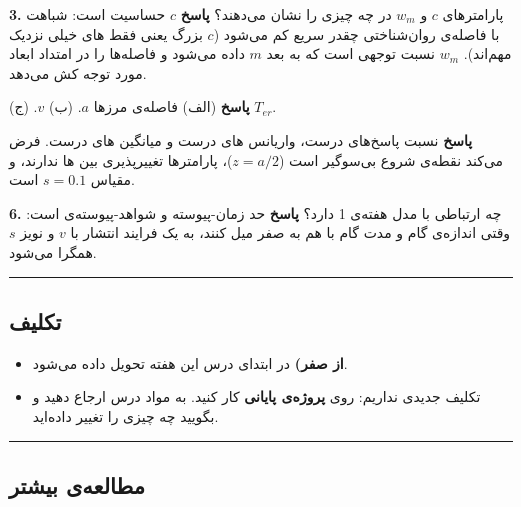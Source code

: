 \textbf{3.} پارامترهای \(c\) و \(w_m\) در  چه چیزی را نشان
می‌دهند؟ \textbf{پاسخ} \(c\) حساسیت است: شباهت با فاصله‌ی روان‌شناختی چقدر
سریع کم می‌شود (\(c\) بزرگ یعنی فقط های خیلی نزدیک مهم‌اند).
\(w_m\) نسبت توجهی است که به بعد \(m\) داده می‌شود و فاصله‌ها را در امتداد
ابعاد مورد توجه کش می‌دهد.

\textbf{پاسخ} (الف) فاصله‌ی مرزها \(a\). (ب)  \(v\). (ج)
 \(T_{er}\).

\textbf{پاسخ} نسبت پاسخ‌های درست، واریانس های درست و میانگین
های درست. فرض می‌کند نقطه‌ی شروع بی‌سوگیر است (\(z = a/2\))،
پارامترها تغییرپذیری بین ها ندارند، و مقیاس \(s = 0.1\) است.

\textbf{6.}  چه ارتباطی با مدل  هفته‌ی 1 دارد؟
\textbf{پاسخ} حد زمان-پیوسته و شواهد-پیوسته‌ی  است: وقتی
اندازه‌ی گام و مدت گام با هم به صفر میل کنند،  به یک
فرایند انتشار  با  \(v\) و نویز \(s\) همگرا می‌شود.

\begin{center}\rule{0.5\linewidth}{0.5pt}\end{center}

\subsection{تکلیف}

\begin{itemize}
\tightlist
\item
  \textbf{ از صفر)} در ابتدای درس این هفته تحویل داده
  می‌شود.
\item
  تکلیف جدیدی نداریم: روی \textbf{پروژه‌ی پایانی} کار کنید. به مواد درس
  ارجاع دهید و بگویید چه چیزی را تغییر داده‌اید.
\end{itemize}

\begin{center}\rule{0.5\linewidth}{0.5pt}\end{center}

\subsection{مطالعه‌ی بیشتر}

